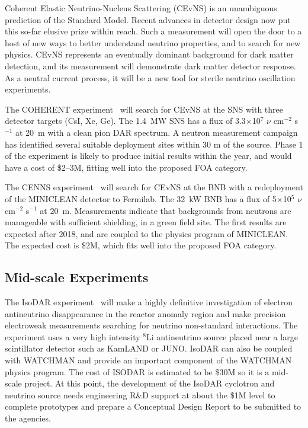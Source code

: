 
\noindent Coherent Elastic Neutrino-Nucleus Scattering (CEvNS) is an
unambiguous prediction of the Standard Model. Recent advances in
detector design now put this so-far elusive prize within reach. Such a
measurement will open the door to a host of new ways to better
understand neutrino properties, and to search for new physics. CEvNS
represents an eventually dominant background for dark matter
detection, and its measurement will demonstrate dark matter detector
response. As a neutral current process, it will be a new tool for
sterile neutrino oscillation experiments.

The COHERENT experiment~\cite{Akimov:2013yow} will search for CEvNS at the
SNS with three detector targets (CsI, Xe, Ge). The 1.4~MW SNS has a
flux of 3.3$\times$10$^{7}$ $\nu$ cm$^{-2}$ s$^{-1}$ at 20~m with a
clean pion DAR spectrum. A neutron measurement campaign has identified
several suitable deployment sites within 30 m of the source. Phase 1
of the experiment is likely to produce initial results within the
year, and would have a cost of \$2--3M, fitting well into the proposed
FOA category.

The CENNS experiment~\cite{Brice:2013fwa} will search for CEvNS at the
BNB with a redeployment of the MINICLEAN detector to Fermilab. The
32~kW BNB has a flux of 5$\times$10$^{5}$ $\nu$ cm$^{-2}$ s$^{-1}$ at
20~m. Measurements indicate that backgrounds from neutrons are
manageable with sufficient shielding, in a green field site. The first
results are expected after 2018, and are coupled to the physics
program of MINICLEAN. The expected cost is \$2M, which fits well into
the proposed FOA category.

\subsection{Mid-scale Experiments}


\noindent The IsoDAR experiment~\cite{IsoDAR,IsoDARJuno} will make a
highly definitive investigation of electron antineutrino disappearance
in the reactor anomaly region and make precision electroweak
measurements searching for neutrino non-standard interactions. The
experiment uses a very high intensity $^8$Li antineutrino source placed
near a large scintillator detector such as KamLAND or JUNO. IsoDAR
can also be coupled with WATCHMAN and provide an important component
of the WATCHMAN physics program. The cost of ISODAR is estimated to
be \$30M so it is a mid-scale project. At this point, the development
of the IsoDAR cyclotron and neutrino source needs engineering R\&D
support at about the \$1M level to complete prototypes and prepare a
Conceptual Design Report to be submitted to the agencies.

